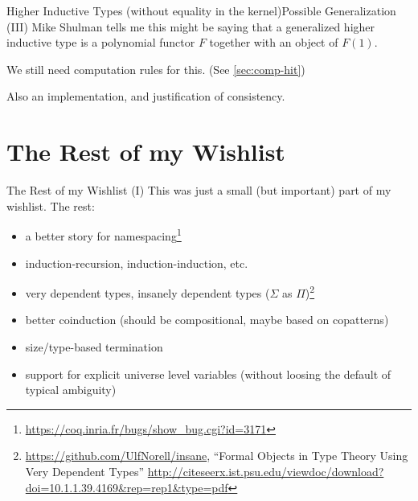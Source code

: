 \documentclass{beamer}
\begin{document}
\begin{frame}{Higher Inductive Types (without equality in the kernel)}{Possible Generalization (III)}
  \Large
  Mike Shulman tells me this might be saying that a generalized higher inductive type is a polynomial functor $F$ together with an object of $F(1)$. \pause
  
  We still need computation rules for this.  \pause (See \autoref{sec:comp-hit}) \pause
  
  Also an implementation, and justification of consistency.
\end{frame}

\section{The Rest of my Wishlist}


\begin{frame}{The Rest of my Wishlist (I)}
This was just a small (but important) part of my wishlist.  The rest:

\begin{itemize}
  \item
    a better story for namespacing\footnote{\url{https://coq.inria.fr/bugs/show\_bug.cgi?id=3171}}
  \item 
    induction-recursion, induction-induction, etc.
  \item
    very dependent types, insanely dependent types ($\Sigma$ as $\Pi$)\footnote{\url{https://github.com/UlfNorell/insane}, ``Formal Objects in Type Theory Using Very Dependent Types'' \url{http://citeseerx.ist.psu.edu/viewdoc/download?doi=10.1.1.39.4169&rep=rep1&type=pdf}}
  \item 
    better coinduction (should be compositional, maybe based on copatterns)
  \item 
    size/type-based termination
  \item 
    support for explicit universe level variables (without loosing the default of typical ambiguity)
\end{itemize}
\end{frame}
\end{document}
